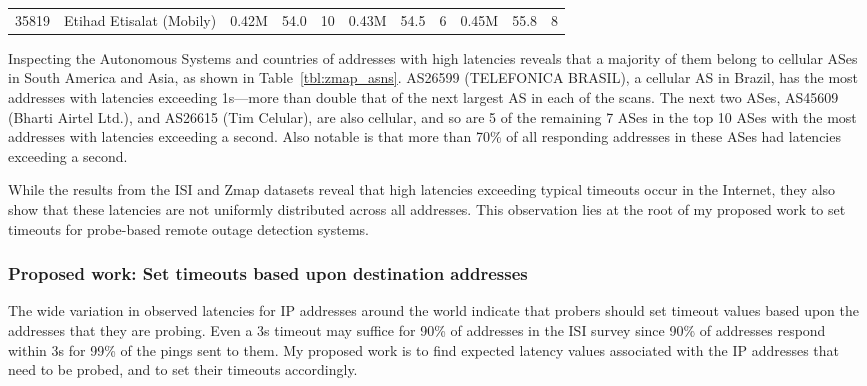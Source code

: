 \begin{table*}[t]
\begin{center}
\begin{small}
\begin{tabular}{ll|rrr|rrr|rrr}
    35819 & Etihad Etisalat (Mobily) & 
    0.42M & 54.0 & 10 &
    0.43M & 54.5 & 6 &    
    0.45M & 55.8 & 8 \\
  \end{tabular}
  \end{small}
  \end{center}
  \caption{\label{tbl:zmap_asns} Autonomous Systems sorted by the
    addresses summed across three Zmap scans for addresses that observed
    RTTs greater than 1s. The table shows for each AS: the number and
    percentage of addresses with RTT greater than 1s and the rank in that scan.}
\end{table*}


Inspecting the Autonomous Systems and countries of addresses with high latencies
reveals that a majority of them belong to cellular ASes in South
America and Asia, as shown in Table~\ref{tbl:zmap_asns}. AS26599
(TELEFONICA BRASIL), a cellular AS in Brazil, has the most addresses
with latencies exceeding 1s---more than double that of the next
largest AS in each of the scans. The next two ASes, AS45609 (Bharti
Airtel Ltd.), and AS26615 (Tim Celular), are also cellular, and so are
5 of the remaining 7 ASes in the top 10 ASes with the most addresses
with latencies exceeding a second. Also notable is that more than 70\%
of all responding addresses in these ASes had latencies exceeding a
second. 


While the results from the ISI and Zmap datasets reveal that high
latencies exceeding typical timeouts occur in the Internet, they also
show that these latencies are not uniformly distributed across all
addresses. This observation lies at the root of my proposed work to
set timeouts for probe-based remote outage detection systems.

\subsubsection{Proposed work: Set timeouts based upon
  destination addresses}

The wide variation in observed latencies for IP addresses around the
world indicate that probers should set timeout values
based upon the addresses that they are probing. Even a 3s
timeout may suffice for 90\% of addresses in the ISI survey since 90\% of addresses respond
within 3s for 99\% of the pings sent to them. My proposed work is to find expected latency values
associated with the IP addresses that need to be probed, and to set
their timeouts accordingly.
 
